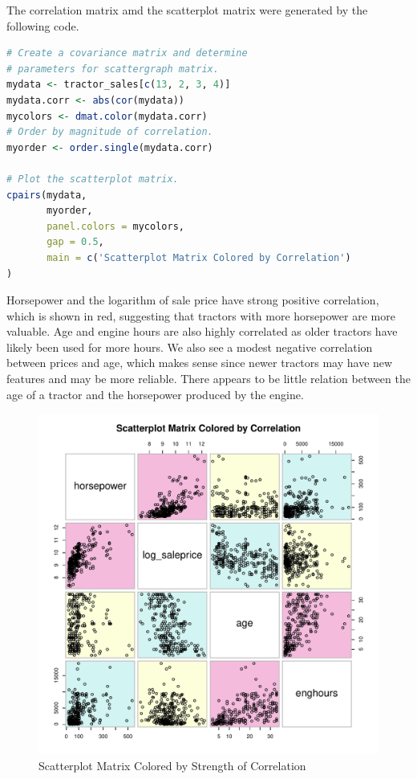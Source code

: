 \documentclass[11pt]{book}
\begin{document}


The correlation matrix amd the scatterplot matrix 
were generated by the following code.

\begin{lstlisting}[language=R]
# Create a covariance matrix and determine
# parameters for scattergraph matrix.
mydata <- tractor_sales[c(13, 2, 3, 4)]
mydata.corr <- abs(cor(mydata))
mycolors <- dmat.color(mydata.corr)
# Order by magnitude of correlation.
myorder <- order.single(mydata.corr) 

# Plot the scatterplot matrix.
cpairs(mydata,
       myorder,
       panel.colors = mycolors,
       gap = 0.5,
       main = c('Scatterplot Matrix Colored by Correlation')
)
\end{lstlisting}


\pagebreak
Horsepower and the logarithm of sale price have strong positive correlation, which is shown in red, 
suggesting that tractors with more horsepower are more valuable.
Age and engine hours are also highly correlated
as older tractors have likely been used for more hours. 
We also see a modest negative correlation between prices and age, 
which makes sense since newer tractors may have new features and may be more reliable. 
There appears to be little relation between the 
age of a tractor and the horsepower produced by the engine.

\begin{figure}[h!]
  \centering
  \includegraphics[scale = 0.5, keepaspectratio=true]{../Figures/scatter_matrix}
  \caption{Scatterplot Matrix Colored by Strength of Correlation} \label{fig:scatter_matrix}
\end{figure}
\end{document}
